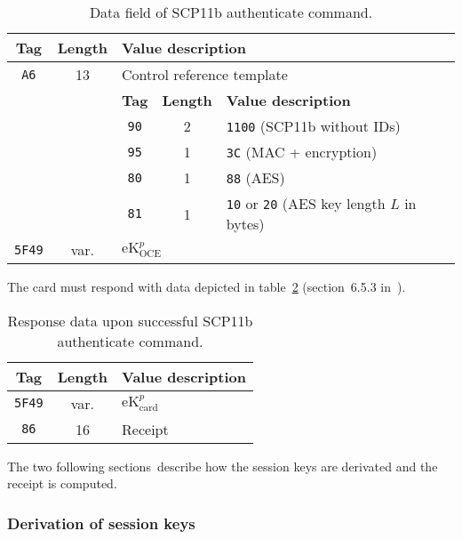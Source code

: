 \documentclass[dvipdfmx,11pt,a4paper,english,final]{article}
\newcommand{\cardekp}[0]{\ensuremath{\mathrm{eK}_\mathrm{card}^p}\xspace}
\newcommand{\oceekp}[0]{\ensuremath{\mathrm{eK}_\mathrm{OCE}^p}\xspace}
\newcommand{\code}[1]{\texttt{#1}\xspace}
\begin{document}
\begin{table}[ht]
  \centering
  \begin{tabular}{|c|c|ccl|}
    \hline
    \textbf{Tag}&\textbf{Length}&\multicolumn{3}{l|}{\textbf{Value description}}\\
    \hline
    \code{A6}&13&\multicolumn{3}{l|}{Control reference template}\\
    \cline{3-5}
                &&\multicolumn{1}{c|}{\textbf{Tag}}&\multicolumn{1}{c|}{\textbf{Length}}&\textbf{Value description}\\
    \cline{3-5}
                &&\multicolumn{1}{c|}{\code{90}}&\multicolumn{1}{c|}{2}&\code{1100} (SCP11b without IDs)\\
                &&\multicolumn{1}{c|}{\code{95}}&\multicolumn{1}{c|}{1}&\code{3C} (MAC + encryption)\\
                &&\multicolumn{1}{c|}{\code{80}}&\multicolumn{1}{c|}{1}&\code{88} (AES)\\
                &&\multicolumn{1}{c|}{\code{81}}&\multicolumn{1}{c|}{1}&\code{10} or \code{20} (AES key length $L$ in bytes)\\
    \hline
    \code{5F49}&var.&\multicolumn{3}{l|}{\oceekp}\\
    \hline
  \end{tabular}
  \caption{Data field of SCP11b authenticate command.}
  \label{tab:scp11:auth:cmd}
\end{table}

The card must respond with data depicted in table~\ref{tab:scp11:auth:resp} (section~6.5.3 in~\cite{gp-scp11}).

\begin{table}[ht]
  \centering
  \begin{tabular}{|c|c|l|}
    \hline
    \textbf{Tag}&\textbf{Length}&\textbf{Value description}\\
    \hline
    \code{5F49}&var.&\cardekp\\
    \hline
    \code{86}&16&Receipt\\
    \hline
  \end{tabular}
  \caption{Response data upon successful SCP11b authenticate command.}
  \label{tab:scp11:auth:resp}
\end{table}

The two following sections~describe how the session keys are derivated and the receipt is computed.

\subsubsection{Derivation of session keys}
\end{document}
